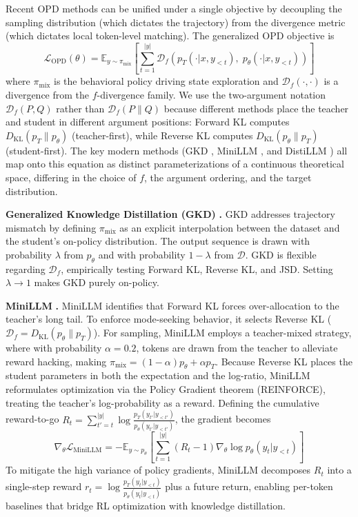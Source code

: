 \documentclass{article} %
\newcommand{\KL}{D_{\mathrm{KL}}}
\newcommand{\ptheta}{p_\theta}
\newcommand{\pteacher}{p_T}
\newcommand{\loss}{\mathcal{L}}
\begin{document}
Recent OPD methods can be unified under a single objective by decoupling the sampling distribution (which dictates the trajectory) from the divergence metric (which dictates local token-level matching). The generalized OPD objective is
\begin{equation}
    \loss_{\mathrm{OPD}}(\theta) = \mathbb{E}_{y \sim \pi_{\mathrm{mix}}} \left[ \sum_{t=1}^{|y|} \mathcal{D}_f \left( \pteacher(\cdot | x, y_{<t}),\; \ptheta(\cdot | x, y_{<t}) \right) \right]
\end{equation}
where $\pi_{\mathrm{mix}}$ is the behavioral policy driving state exploration and $\mathcal{D}_f(\cdot, \cdot)$ is a divergence from the $f$-divergence family. We use the two-argument notation $\mathcal{D}_f(P, Q)$ rather than $\mathcal{D}_f(P \| Q)$ because different methods place the teacher and student in different argument positions: Forward KL computes $\KL(\pteacher \| \ptheta)$ (teacher-first), while Reverse KL computes $\KL(\ptheta \| \pteacher)$ (student-first). The key modern methods (GKD \citep{2306.13649}, MiniLLM \citep{2306.08543}, and DistiLLM \citep{2402.03898}) all map onto this equation as distinct parameterizations of a continuous theoretical space, differing in the choice of $f$, the argument ordering, and the target distribution.

\textbf{Generalized Knowledge Distillation (GKD)} \citep{2306.13649}\textbf{.} GKD addresses trajectory mismatch by defining $\pi_{\mathrm{mix}}$ as an explicit interpolation between the dataset and the student's on-policy distribution. The output sequence is drawn with probability $\lambda$ from $\ptheta$ and with probability $1-\lambda$ from $\mathcal{D}$. GKD is flexible regarding $\mathcal{D}_f$, empirically testing Forward KL, Reverse KL, and JSD. Setting $\lambda \to 1$ makes GKD purely on-policy.

\textbf{MiniLLM} \citep{2306.08543}\textbf{.} MiniLLM identifies that Forward KL forces over-allocation to the teacher's long tail. To enforce mode-seeking behavior, it selects Reverse KL ($\mathcal{D}_f = \KL(\ptheta \parallel \pteacher)$). For sampling, MiniLLM employs a teacher-mixed strategy, where with probability $\alpha = 0.2$, tokens are drawn from the teacher to alleviate reward hacking, making $\pi_{\mathrm{mix}} = (1 - \alpha)\ptheta + \alpha \pteacher$. Because Reverse KL places the student parameters in both the expectation and the log-ratio, MiniLLM reformulates optimization via the Policy Gradient theorem (REINFORCE), treating the teacher's log-probability as a reward. Defining the cumulative reward-to-go $R_t = \sum_{t'=t}^{|y|} \log \frac{\pteacher(y_{t'}|y_{<t'})}{\ptheta(y_{t'}|y_{<t'})}$, the gradient becomes
\begin{equation}
    \nabla_\theta \mathcal{L}_{\mathrm{MiniLLM}} = -\mathbb{E}_{y \sim \ptheta} \left[ \sum_{t=1}^{|y|} \left( R_t - 1 \right) \nabla_\theta \log \ptheta(y_t|y_{<t}) \right]
\end{equation}
To mitigate the high variance of policy gradients, MiniLLM decomposes $R_t$ into a single-step reward $r_t = \log \frac{\pteacher(y_t|y_{<t})}{\ptheta(y_t|y_{<t})}$ plus a future return, enabling per-token baselines that bridge RL optimization with knowledge distillation.
\end{document}
